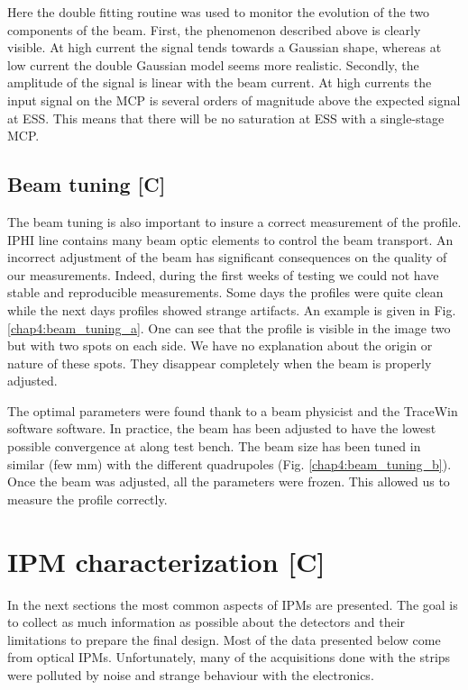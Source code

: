 \begin{refsection}
  

  Here the double fitting routine was used to monitor the evolution of the two components of the beam. First, the phenomenon described above is clearly visible. At high current the signal tends towards a Gaussian shape, whereas at low current the double Gaussian model seems more realistic. Secondly, the amplitude of the signal is linear with the beam current. At high currents the input signal on the MCP is several orders of magnitude above the expected signal at ESS. This means that there will be no saturation at ESS with a single-stage MCP.

  \subsection{Beam tuning [C]}
  The beam tuning is also important to insure a correct measurement of the profile. IPHI line contains many beam optic elements to control the beam transport. An incorrect adjustment of the beam has significant consequences on the quality of our measurements. Indeed, during the first weeks of testing we could not have stable and reproducible measurements. Some days the profiles were quite clean while the next days profiles showed strange artifacts. An example is given in Fig. \ref{chap4:beam_tuning_a}. One can see that the profile is visible in the image two but with two spots on each side. We have no explanation about the origin or nature of these spots. They disappear completely when the beam is properly adjusted.
  
  The optimal parameters were found thank to a beam physicist and the TraceWin software software. In practice, the beam has been adjusted to have the lowest possible convergence at along test bench. The beam size has been tuned  in similar (few mm) with the different quadrupoles (Fig. \ref{chap4:beam_tuning_b}). Once the beam was adjusted, all the parameters were frozen. This allowed us to measure the profile correctly.

  


  \section{IPM characterization [C]}
  In the next sections the most common aspects of IPMs are presented. The goal is to collect as much information as possible about the detectors and their limitations to prepare the final design. Most of the data presented below come from optical IPMs. Unfortunately, many of the acquisitions done with the strips were polluted by noise and strange behaviour with the electronics.


\end{refsection}
